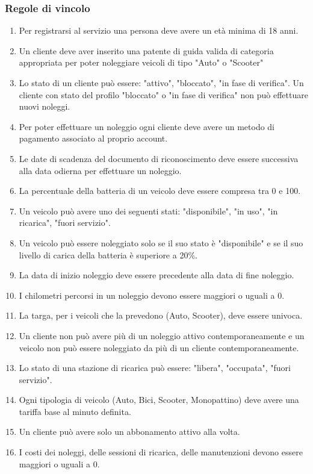 \documentclass{article}
\begin{document}
\subsubsection{Regole di vincolo}
\begin{enumerate}
    \item Per registrarsi al servizio una persona deve avere un età minima di 18 anni.
    \item Un cliente deve aver inserito una patente  di guida valida di categoria appropriata per poter noleggiare veicoli di tipo "Auto" o "Scooter"
    \item Lo stato di un cliente può essere: "attivo", "bloccato", "in fase di verifica". Un cliente con stato del profilo "bloccato" o "in fase di verifica" non può effettuare nuovi noleggi.
    \item Per poter effettuare un noleggio ogni cliente deve avere un metodo di pagamento associato al proprio account.
    \item Le date di scadenza del documento di riconoscimento deve essere successiva alla data odierna per effettuare un noleggio.
    \item La percentuale della batteria di un veicolo deve essere compresa tra 0 e 100.
    \item Un veicolo può avere uno dei seguenti stati: "disponibile", "in uso", "in ricarica", "fuori servizio".
    \item Un veicolo può essere noleggiato solo se il suo stato è "disponibile" e se il suo livello di carica della batteria è superiore a 20\%.
    \item La data di inizio noleggio deve essere precedente alla data di fine noleggio.
    \item I chilometri percorsi in un noleggio devono essere maggiori o uguali a 0.
    \item La targa, per i veicoli che la prevedono (Auto, Scooter), deve essere univoca.
    \item Un cliente non può avere più di un noleggio attivo contemporaneamente e un veicolo non può essere noleggiato da più di un cliente contemporaneamente.
    \item Lo stato di una stazione di ricarica può essere: "libera", "occupata", "fuori servizio".
    \item Ogni tipologia di veicolo (Auto, Bici, Scooter, Monopattino) deve avere una tariffa base al minuto definita.
    \item Un cliente può avere solo un abbonamento attivo alla volta.
    \item I costi dei noleggi, delle sessioni di ricarica, delle manutenzioni devono essere maggiori o uguali a 0.
\end{enumerate}
\end{document}
